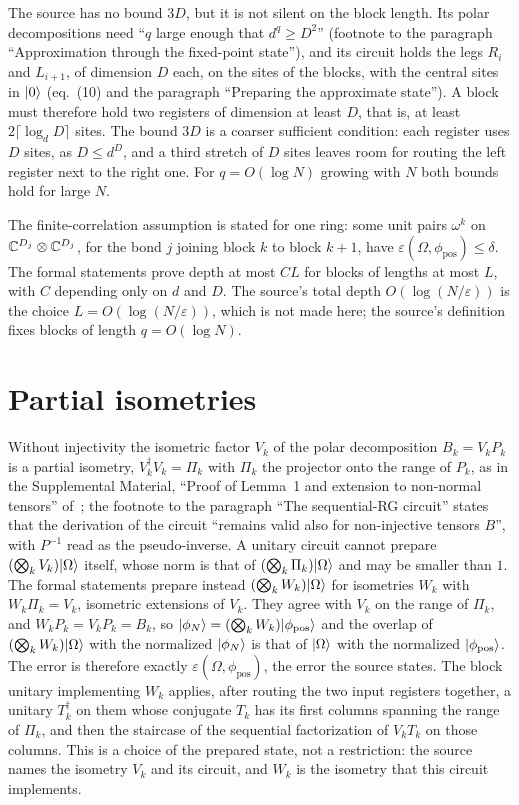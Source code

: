 \documentclass{article}
\begin{document}
The source has no bound $3D$, but it is not silent on the block length. Its
polar decompositions need ``$q$ large enough that $d^q\geq D^2$'' (footnote to
the paragraph ``Approximation through the fixed-point state''), and its circuit
holds the legs $R_i$ and $L_{i+1}$, of dimension $D$ each, on the sites of the
blocks, with the central sites in $|0\rangle$ (eq.~(10) and the paragraph
``Preparing the approximate state''). A block must therefore hold two registers
of dimension at least $D$, that is, at least $2\lceil\log_dD\rceil$ sites. The
bound $3D$ is a coarser sufficient condition: each register uses $D$ sites, as
$D\le d^D$, and a third stretch of $D$ sites leaves room for routing the left
register next to the right one. For $q=O(\log N)$ growing with $N$ both bounds
hold for large $N$.

The finite-correlation assumption is stated for one ring: some unit pairs
$\omega^k$ on $\mathbb{C}^{D_j}\otimes\mathbb{C}^{D_j}$, for the bond $j$ joining block $k$ to
block $k+1$, have $\varepsilon(\Omega,\phi_{\mathrm{pos}})\le\delta$. The
formal statements prove depth at most $CL$ for blocks of lengths at most $L$,
with $C$ depending only on $d$ and $D$. The source's total depth
$O(\log(N/\varepsilon))$ is the choice $L=O(\log(N/\varepsilon))$, which is not
made here; the source's definition fixes blocks of length $q=O(\log N)$.

\section{Partial isometries}
Without injectivity the isometric factor $V_k$ of the polar decomposition
$B_k=V_kP_k$ is a partial isometry, $V_k^\dagger V_k=\Pi_k$ with $\Pi_k$ the
projector onto the range of $P_k$, as in the Supplemental Material, ``Proof of
Lemma~1 and extension to non-normal tensors'' of~\cite{Malz2024Preparation}; the
footnote to the paragraph ``The sequential-RG circuit'' states that the
derivation of the circuit ``remains valid also for non-injective tensors $B$'',
with $P^{-1}$ read as the pseudo-inverse. A unitary circuit cannot prepare
$(\bigotimes_kV_k)|\Omega\rangle$ itself, whose norm is that of
$(\bigotimes_k\Pi_k)|\Omega\rangle$ and may be smaller than $1$. The formal
statements prepare instead $(\bigotimes_kW_k)|\Omega\rangle$ for isometries $W_k$
with $W_k\Pi_k=V_k$, isometric extensions of $V_k$. They agree with $V_k$ on the
range of $\Pi_k$, and $W_kP_k=V_kP_k=B_k$, so
$|\phi_N\rangle=(\bigotimes_kW_k)|\phi_{\mathrm{pos}}\rangle$ and the overlap of
$(\bigotimes_kW_k)|\Omega\rangle$ with the normalized $|\phi_N\rangle$ is that of
$|\Omega\rangle$ with the normalized $|\phi_{\mathrm{pos}}\rangle$. The error is
therefore exactly $\varepsilon(\Omega,\phi_{\mathrm{pos}})$, the error the
source states. The block unitary implementing $W_k$ applies, after routing the
two input registers together, a unitary $T_k^\dagger$ on them whose
conjugate $T_k$ has its first columns spanning the range of $\Pi_k$, and then
the staircase of the sequential factorization of $V_kT_k$ on those columns.
This is a choice of the prepared state, not a restriction: the source names the
isometry $V_k$ and its circuit, and $W_k$ is the isometry that this circuit
implements.
\end{document}
